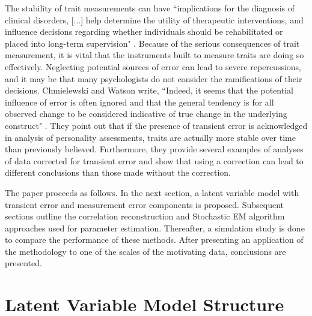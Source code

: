 \documentclass[12pt]{article}
\begin{document}
The stability of trait measurements can have ``implications for the
diagnosis of clinical disorders, [...] help determine the utility of
therapeutic interventions, and influence decisions regarding whether
individuals should be rehabilitated or placed into long-term supervision" 
\cite{Chmielewski09}. Because of the serious consequences of trait
measurement, it is vital that the instruments built to measure traits are
doing so effectively. Neglecting potential sources of error can lead to
severe repercussions, and it may be that many psychologists do not consider
the ramifications of their decisions. Chmielewski and Watson write,
``Indeed, it seems that the potential influence of error is often ignored
and that the general tendency is for all observed change to be considered
indicative of true change in the underlying construct" \cite{Chmielewski09}.
They point out that if the presence of transient error is acknowledged in
analysis of personality assessments, traits are actually more stable over
time than previously believed. Furthermore, they provide several examples of
analyses of data corrected for transient error and show that using a
correction can lead to different conclusions than those made without the
correction.

The paper proceeds as follows. In the next section, a latent variable model with transient error and measurement error components is proposed. Subsequent sections outline the correlation reconstruction and Stochastic EM algorithm approaches used for parameter estimation. Thereafter, a simulation study is done to compare the performance of these methods. After presenting an application of the methodology to one of the scales of the motivating data, conclusions are presented.

\section{Latent Variable Model Structure}
\end{document}
